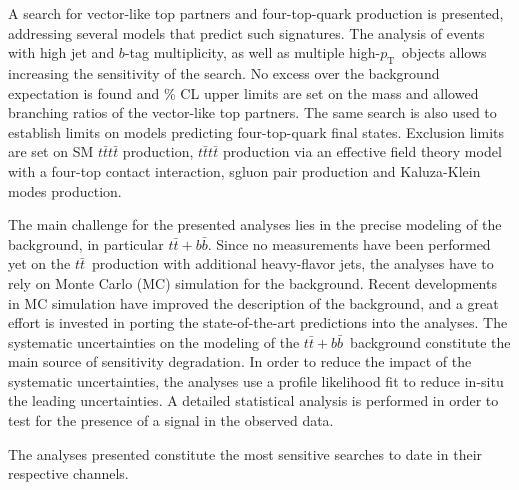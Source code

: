 \documentclass{article}
\newcommand\fourtop{{\ensuremath{t\bar{t}t\bar{t}}}}
\def\ttbar{\ensuremath{t\bar{t}}}
\def\ttbb{\ensuremath{t\bar{t}+b\bar{b}}}
\def\pt{\ensuremath{p_{\mathrm{T}}}} %
\begin{document}
A search for vector-like top partners and four-top-quark production is presented, addressing several models that predict such signatures. The analysis of events with high jet and $b$-tag multiplicity, as well as multiple high-\pt\ objects allows increasing the sensitivity of the search. No excess over the background expectation is found and \unit[95]{\%} CL upper limits are set on the mass and allowed branching ratios of the vector-like top partners.
The same search is also used to establish limits on models predicting four-top-quark final states. Exclusion limits are set on SM $\fourtop$ production, $\fourtop$ production via an effective field theory model with a four-top contact interaction, sgluon pair production and Kaluza-Klein modes production. 
\newline

The main challenge for the presented analyses lies in the precise modeling of the background, in particular \ttbb. Since no measurements have been performed yet on the \ttbar\ production with additional heavy-flavor jets, the analyses have to rely on Monte Carlo (MC) simulation for the background. Recent developments in MC simulation have improved the description of the background, and a great effort is invested in porting the state-of-the-art predictions into the analyses. The systematic uncertainties on the modeling of the \ttbb\ background constitute the main source of sensitivity degradation.
In order to reduce the impact of the systematic uncertainties, the analyses use a profile likelihood fit to reduce in-situ the leading uncertainties. A detailed statistical analysis is performed in order to test for the presence of a signal in the observed data.
\newline

The analyses presented constitute the most sensitive searches to date in their respective channels.
\end{document}

